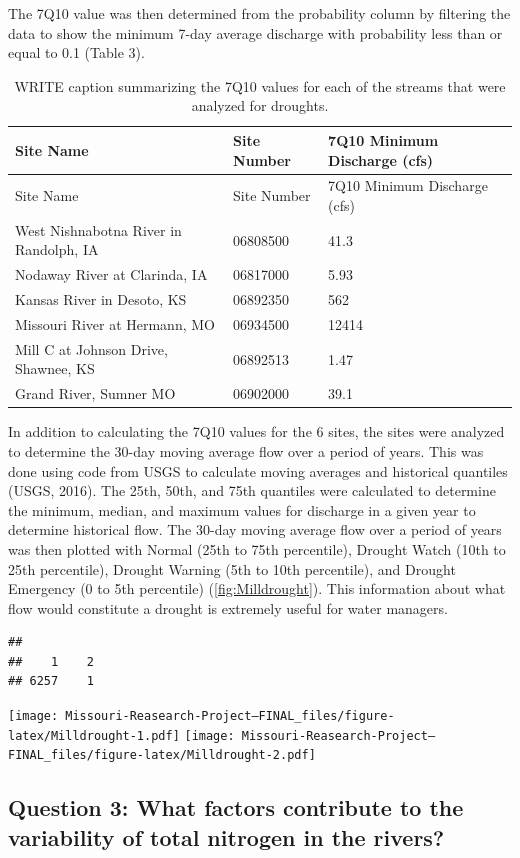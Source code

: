 \documentclass[12pt,]{article}
\begin{document}
The 7Q10 value was then determined from the probability column by
filtering the data to show the minimum 7-day average discharge with
probability less than or equal to 0.1 (Table 3).

\begin{longtable}[]{@{}lll@{}}
\caption{WRITE caption summarizing the 7Q10 values for each of the
streams that were analyzed for droughts.}\tabularnewline
\toprule
Site Name & Site Number & 7Q10 Minimum Discharge (cfs)\tabularnewline
\midrule
\endfirsthead
\toprule
Site Name & Site Number & 7Q10 Minimum Discharge (cfs)\tabularnewline
\midrule
\endhead
West Nishnabotna River in Randolph, IA & 06808500 & 41.3\tabularnewline
Nodaway River at Clarinda, IA & 06817000 & 5.93\tabularnewline
Kansas River in Desoto, KS & 06892350 & 562\tabularnewline
Missouri River at Hermann, MO & 06934500 & 12414\tabularnewline
Mill C at Johnson Drive, Shawnee, KS & 06892513 & 1.47\tabularnewline
Grand River, Sumner MO & 06902000 & 39.1\tabularnewline
\bottomrule
\end{longtable}

In addition to calculating the 7Q10 values for the 6 sites, the sites
were analyzed to determine the 30-day moving average flow over a period
of years. This was done using code from USGS to calculate moving
averages and historical quantiles (USGS, 2016). The 25th, 50th, and 75th
quantiles were calculated to determine the minimum, median, and maximum
values for discharge in a given year to determine historical flow. The
30-day moving average flow over a period of years was then plotted with
Normal (25th to 75th percentile), Drought Watch (10th to 25th
percentile), Drought Warning (5th to 10th percentile), and Drought
Emergency (0 to 5th percentile) (\autoref{fig:Milldrought}). This
information about what flow would constitute a drought is extremely
useful for water managers.

\begin{verbatim}
## 
##    1    2 
## 6257    1
\end{verbatim}

\texttt{[image: Missouri-Reasearch-Project---FINAL\_files/figure-latex/Milldrought-1.pdf]}
\texttt{[image: Missouri-Reasearch-Project---FINAL\_files/figure-latex/Milldrought-2.pdf]}

\hypertarget{question-3-what-factors-contribute-to-the-variability-of-total-nitrogen-in-the-rivers}{%
\subsection{Question 3: What factors contribute to the variability of
total nitrogen in the
rivers?}\label{question-3-what-factors-contribute-to-the-variability-of-total-nitrogen-in-the-rivers}}
\end{document}
